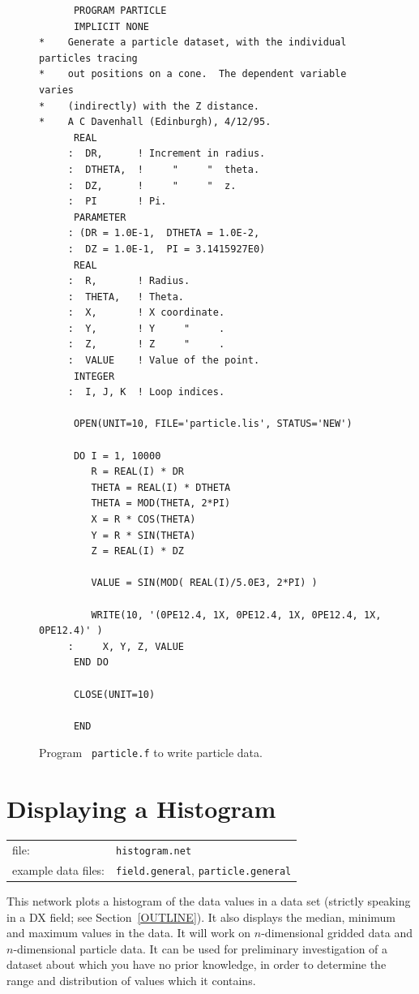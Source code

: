 \documentclass[twoside,11pt]{article}
\newcommand{\xlabel}[1]{}
\begin{document}
\begin{figure}[htbp]

\begin{verbatim}
      PROGRAM PARTICLE
      IMPLICIT NONE
*    Generate a particle dataset, with the individual particles tracing
*    out positions on a cone.  The dependent variable varies
*    (indirectly) with the Z distance.
*    A C Davenhall (Edinburgh), 4/12/95.
      REAL
     :  DR,      ! Increment in radius.
     :  DTHETA,  !     "     "  theta.
     :  DZ,      !     "     "  z.
     :  PI       ! Pi.
      PARAMETER
     : (DR = 1.0E-1,  DTHETA = 1.0E-2,
     :  DZ = 1.0E-1,  PI = 3.1415927E0)
      REAL
     :  R,       ! Radius.
     :  THETA,   ! Theta.
     :  X,       ! X coordinate.
     :  Y,       ! Y     "     .
     :  Z,       ! Z     "     .
     :  VALUE    ! Value of the point.
      INTEGER
     :  I, J, K  ! Loop indices.

      OPEN(UNIT=10, FILE='particle.lis', STATUS='NEW')

      DO I = 1, 10000
         R = REAL(I) * DR
         THETA = REAL(I) * DTHETA
         THETA = MOD(THETA, 2*PI)
         X = R * COS(THETA)
         Y = R * SIN(THETA)
         Z = REAL(I) * DZ

         VALUE = SIN(MOD( REAL(I)/5.0E3, 2*PI) )

         WRITE(10, '(0PE12.4, 1X, 0PE12.4, 1X, 0PE12.4, 1X, 0PE12.4)' )
     :     X, Y, Z, VALUE
      END DO

      CLOSE(UNIT=10)

      END
\end{verbatim}

\caption[Program {\tt particle.f} to write particle data.]{Program {\tt
particle.f} to write particle data. \label{PARTICLE.F} }

\end{figure}


\newpage
\section{\xlabel{HISTNET}\label{HISTNET}Displaying a Histogram}


\begin{tabular}{ll}
file:               & {\tt histogram.net} \\
example data files: & {\tt field.general}, {\tt particle.general} \\
\end{tabular}

This network plots a histogram of the data values in a data set (strictly
speaking in a DX field; see Section~\ref{OUTLINE}). It also displays the
median, minimum and maximum values in the data. It will work on
$n$-dimensional gridded data and $n$-dimensional particle data. It can be
used for preliminary investigation of a dataset about which you have no
prior knowledge, in order to determine the range and distribution of
values which it contains.
\end{document}
